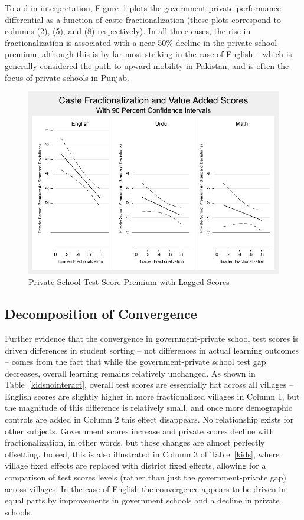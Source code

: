 \documentclass[Eubank_pk_ethnic_sorting.tex]{subfiles}
\begin{document}
To aid in interpretation, Figure~\ref{kidscombined} plots the government-private performance differential as a function of caste fractionalization (these plots correspond to columns (2), (5), and (8) respectively). In all three cases, the rise in fractionalization is associated with a near 50\% decline in the private school premium, although this is by far most striking in the case of English -- which is generally considered the path to upward mobility in Pakistan, and is often the focus of private schools in Punjab. 

\begin{figure}[h]
	\caption{Private School Test Score Premium with Lagged Scores}\label{kidscombined}
	\centering	
	\includegraphics[scale=0.8]{../results/kids_combined.pdf}
\end{figure}


\subsection{Decomposition of Convergence}\label{village_level_outcomes}

Further evidence that the convergence in government-private school test scores is driven differences in student sorting -- not differences in actual learning outcomes -- comes from the fact that while the government-private school test gap decreases, overall learning remains relatively unchanged. As shown in Table~\ref{kidsnointeract}, overall test scores are essentially flat across all villages -- English scores are slightly higher in more fractionalized villages in Column 1, but the magnitude of this difference is relatively small, and once more demographic controls are added in Column 2 this effect disappears. No relationship exists for other subjects. Government scores increase and private scores decline with fractionalization, in other words, but those changes are almost perfectly offsetting. Indeed, this is also illustrated in Column 3 of Table~\ref{kids}, where village fixed effects are replaced with district fixed effects, allowing for a comparison of test scores levels (rather than just the government-private gap) across villages. In the case of English the convergence appears to be driven in equal parts by improvements in government schools and a decline in private schools.
\end{document}
